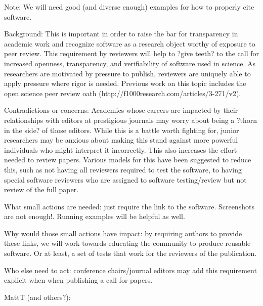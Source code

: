 \documentclass[a4paper,UKenglish]{dagman}
\begin{document}
Note: We will need good (and diverse enough) examples for how to properly cite software.


Background: This is important in order to raise the bar for transparency in academic work and recognize software as a research object worthy of exposure to peer review. This requirement by reviewers will help to ?give teeth? to the call for increased openness, transparency, and verifiability of software used in science. As researchers are motivated by pressure to publish, reviewers are uniquely able to apply pressure where rigor is needed. Previous work on this topic includes the open science peer review oath (http://f1000research.com/articles/3-271/v2). 

Contradictions or concerns: Academics whose careers are impacted by their relationships with editors at prestigious journals may worry about being a ?thorn in the side? of those editors. While this is a battle worth fighting for, junior researchers may be anxious about making this stand against more powerful individuals who might interpret it incorrectly. 
This also increases the effort needed to review papers.  Various models for this have been suggested to reduce this, such as not having all reviewers required to test the software, to having special software reviewers who are assigned to software testing/review but not review of the full paper.

What small actions are needed: just require the link to the software. Screenshots are not enough!. Running examples will be helpful as well.

Why would those small actions have impact: by requiring authors to provide these links, we will work towards educating the community to produce reusable software. Or at least, a set of tests that work for the reviewers of the publication. 

Who else need to act: conference chairs/journal editors may add this requirement explicit when when publishing a call for papers. 

MattT (and others?):

\end{document}
